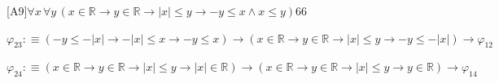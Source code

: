 \begin{fullproof}{[A9]}{$\forall x\,\forall y\,(x \in \mathbb{R} \to y \in \mathbb{R} \to \lvert x \rvert \leq y \to -y \leq x \land x \leq y)$}{66}
\begin{abbrevlist}
\item $\varphi_{23} :\equiv (-y \leq -\lvert x \rvert \to -\lvert x \rvert \leq x \to -y \leq x) \to (x \in \mathbb{R} \to y \in \mathbb{R} \to \lvert x \rvert \leq y \to -y \leq -\lvert x \rvert) \to \varphi_{12}$
\item $\varphi_{24} :\equiv (x \in \mathbb{R} \to y \in \mathbb{R} \to \lvert x \rvert \leq y \to \lvert x \rvert \in \mathbb{R}) \to (x \in \mathbb{R} \to y \in \mathbb{R} \to \lvert x \rvert \leq y \to y \in \mathbb{R}) \to \varphi_{14}$
\end{abbrevlist}
\end{fullproof}
